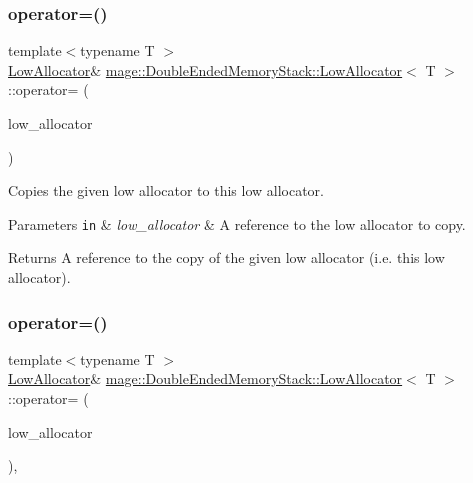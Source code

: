\subsubsection{\texorpdfstring{operator=()}{operator=()}\hspace{0.1cm}{\footnotesize\ttfamily [1/2]}}
{\footnotesize\ttfamily template$<$typename T $>$ \\
\mbox{\hyperlink{classmage_1_1_double_ended_memory_stack_1_1_low_allocator}{Low\+Allocator}}\& \mbox{\hyperlink{classmage_1_1_double_ended_memory_stack_1_1_low_allocator}{mage\+::\+Double\+Ended\+Memory\+Stack\+::\+Low\+Allocator}}$<$ T $>$\+::operator= (\begin{DoxyParamCaption}\item[{const \mbox{\hyperlink{classmage_1_1_double_ended_memory_stack_1_1_low_allocator}{Low\+Allocator}}$<$ T $>$ \&}]{low\+\_\+allocator }\end{DoxyParamCaption})\hspace{0.3cm}{\ttfamily [delete]}}

Copies the given low allocator to this low allocator.


\begin{DoxyParams}[1]{Parameters}
\mbox{\tt in}  & {\em low\+\_\+allocator} & A reference to the low allocator to copy. \\
\hline
\end{DoxyParams}
\begin{DoxyReturn}{Returns}
A reference to the copy of the given low allocator (i.\+e. this low allocator). 
\end{DoxyReturn}
\mbox{\label{classmage_1_1_double_ended_memory_stack_1_1_low_allocator_a5cdfc73e8f91ec41f5efa3499141f3b3}} 
\subsubsection{\texorpdfstring{operator=()}{operator=()}\hspace{0.1cm}{\footnotesize\ttfamily [2/2]}}
{\footnotesize\ttfamily template$<$typename T $>$ \\
\mbox{\hyperlink{classmage_1_1_double_ended_memory_stack_1_1_low_allocator}{Low\+Allocator}}\& \mbox{\hyperlink{classmage_1_1_double_ended_memory_stack_1_1_low_allocator}{mage\+::\+Double\+Ended\+Memory\+Stack\+::\+Low\+Allocator}}$<$ T $>$\+::operator= (\begin{DoxyParamCaption}\item[{\mbox{\hyperlink{classmage_1_1_double_ended_memory_stack_1_1_low_allocator}{Low\+Allocator}}$<$ T $>$ \&\&}]{low\+\_\+allocator }\end{DoxyParamCaption})\hspace{0.3cm}{\ttfamily [default]}, {\ttfamily [noexcept]}}

